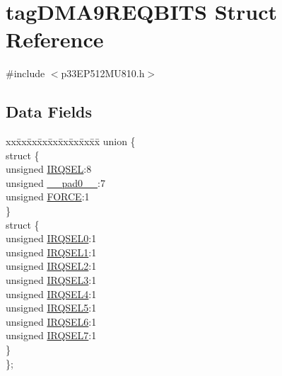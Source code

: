 \hypertarget{structtag_d_m_a9_r_e_q_b_i_t_s}{}\section{tag\+D\+M\+A9\+R\+E\+Q\+B\+I\+TS Struct Reference}
\label{structtag_d_m_a9_r_e_q_b_i_t_s}


{\ttfamily \#include $<$p33\+E\+P512\+M\+U810.\+h$>$}

\subsection*{Data Fields}
\begin{DoxyCompactItemize}
\item 
\begin{tabbing}
xx\=xx\=xx\=xx\=xx\=xx\=xx\=xx\=xx\=\kill
union \{\\
\>struct \{\\
\>\>unsigned \hyperlink{structtag_d_m_a9_r_e_q_b_i_t_s_a5e70ba01366ab2f37371d52661dd93b2}{IRQSEL}:8\\
\>\>unsigned \hyperlink{structtag_d_m_a9_r_e_q_b_i_t_s_adf71f3d8410c1f1dbbc96680a92c49af}{\_\_pad0\_\_}:7\\
\>\>unsigned \hyperlink{structtag_d_m_a9_r_e_q_b_i_t_s_a9b378a7ffc1ab4bc4a3710fb36389180}{FORCE}:1\\
\>\} \\
\>struct \{\\
\>\>unsigned \hyperlink{structtag_d_m_a9_r_e_q_b_i_t_s_ac73241b8f783760c9192dfd8a0773cad}{IRQSEL0}:1\\
\>\>unsigned \hyperlink{structtag_d_m_a9_r_e_q_b_i_t_s_a45e1f083e5a8a59f25acc35910732426}{IRQSEL1}:1\\
\>\>unsigned \hyperlink{structtag_d_m_a9_r_e_q_b_i_t_s_a60dda7474727b3624ca25fa0067a8924}{IRQSEL2}:1\\
\>\>unsigned \hyperlink{structtag_d_m_a9_r_e_q_b_i_t_s_aeaafe1b8c89398ed382054ab628aed78}{IRQSEL3}:1\\
\>\>unsigned \hyperlink{structtag_d_m_a9_r_e_q_b_i_t_s_a91c4162e0f3d4ac7adcdb49302f19840}{IRQSEL4}:1\\
\>\>unsigned \hyperlink{structtag_d_m_a9_r_e_q_b_i_t_s_a6382d50430464cf20b3dee3dbf2e8c01}{IRQSEL5}:1\\
\>\>unsigned \hyperlink{structtag_d_m_a9_r_e_q_b_i_t_s_ace52408ef8c29561f3c56a3fbcbc8217}{IRQSEL6}:1\\
\>\>unsigned \hyperlink{structtag_d_m_a9_r_e_q_b_i_t_s_acce7dedecdf1f53cdbead3edf7c5d53a}{IRQSEL7}:1\\
\>\} \\
\}; \\

\end{tabbing}\end{DoxyCompactItemize}


